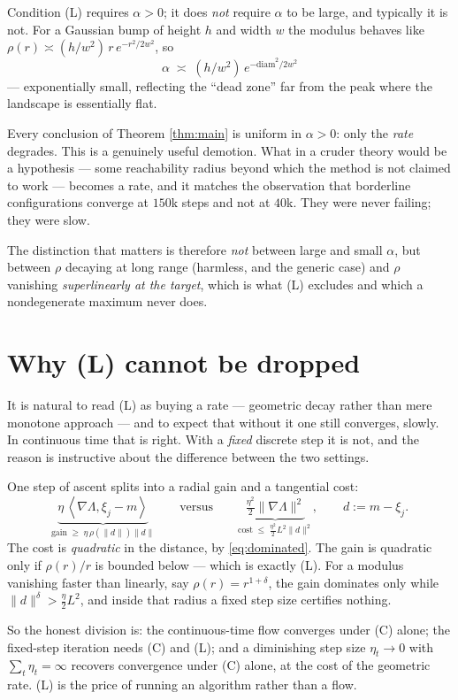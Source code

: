 \documentclass[11pt]{article}
\theoremstyle{definition}
\newcommand{\ip}[2]{\left\langle #1, #2 \right\rangle}
\begin{document}
Condition (L) requires $\alpha > 0$; it does \emph{not} require $\alpha$ to be
large, and typically it is not. For a Gaussian bump of height $h$ and width $w$
the modulus behaves like $\rho(r) \asymp (h/w^2)\,r\,e^{-r^2/2w^2}$, so
\[
  \alpha \;\asymp\; (h/w^2)\,e^{-\mathrm{diam}^2/2w^2}
\]
--- exponentially small, reflecting the ``dead zone'' far from the peak where the
landscape is essentially flat.

Every conclusion of Theorem \ref{thm:main} is uniform in $\alpha > 0$: only the
\emph{rate} degrades. This is a genuinely useful demotion. What in a cruder
theory would be a hypothesis --- some reachability radius beyond which the method
is not claimed to work --- becomes a rate, and it matches the observation that
borderline configurations converge at $150$k steps and not at $40$k. They were
never failing; they were slow.

The distinction that matters is therefore \emph{not} between large and small
$\alpha$, but between $\rho$ decaying at long range (harmless, and the generic
case) and $\rho$ vanishing \emph{superlinearly at the target}, which is what (L)
excludes and which a nondegenerate maximum never does.

\section{Why (L) cannot be dropped}\label{sec:whyL}

It is natural to read (L) as buying a rate --- geometric decay rather than mere
monotone approach --- and to expect that without it one still converges, slowly.
In continuous time that is right. With a \emph{fixed} discrete step it is not, and
the reason is instructive about the difference between the two settings.

One step of ascent splits into a radial gain and a tangential cost:
\[
  \underbrace{\eta\,\ip{\nabla\Lambda}{\xi_j - m}}_{\text{gain} \;\ge\; \eta\,\rho(\|d\|)\|d\|}
  \qquad\text{versus}\qquad
  \underbrace{\tfrac{\eta^2}{2}\|\nabla\Lambda\|^2}_{\text{cost} \;\le\; \tfrac{\eta^2}{2}L^2\|d\|^2} ,
  \qquad d := m - \xi_j .
\]
The cost is \emph{quadratic} in the distance, by \eqref{eq:dominated}. The gain is
quadratic only if $\rho(r)/r$ is bounded below --- which is exactly (L). For a
modulus vanishing faster than linearly, say $\rho(r) = r^{1+\delta}$, the gain
dominates only while $\|d\|^\delta > \tfrac{\eta}{2}L^2$, and inside that radius a
fixed step size certifies nothing.

So the honest division is: the continuous-time flow converges under (C) alone;
the fixed-step iteration needs (C) and (L); and a diminishing step size
$\eta_t \to 0$ with $\sum_t \eta_t = \infty$ recovers convergence under (C) alone,
at the cost of the geometric rate. (L) is the price of running an algorithm rather
than a flow.
\end{document}
